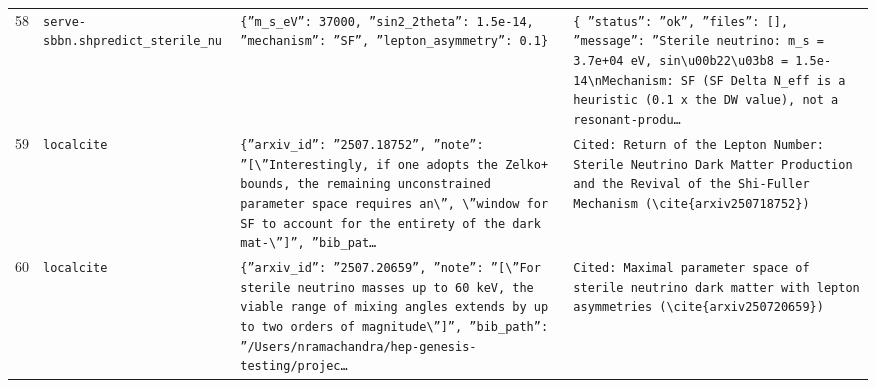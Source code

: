 \documentclass[11pt,a4paper]{article}
\begin{document}
\begin{longtable}{@{}p{}p{}p{}p{}@{}}
58 & \texttt{serve-sbbn.sh}\newline\texttt{predict\_\allowbreak{}sterile\_\allowbreak{}nu} & \texttt{\{''m\_\allowbreak{}s\_\allowbreak{}eV'':\allowbreak{} 37000,\allowbreak{} ''sin2\_\allowbreak{}2theta'':\allowbreak{} 1.5e-14,\allowbreak{} ''mechanism'':\allowbreak{} ''SF'',\allowbreak{} ''lepton\_\allowbreak{}asymmetry'':\allowbreak{} 0.1\}\allowbreak{}} & \texttt{\{   ''status'':\allowbreak{} ''ok'',\allowbreak{}   ''files'':\allowbreak{} []\allowbreak{},\allowbreak{}   ''message'':\allowbreak{} ''Sterile neutrino:\allowbreak{} m\_\allowbreak{}s =\allowbreak{} 3.7e+04 eV,\allowbreak{} sin\textbackslash{}\allowbreak{}u00b22\textbackslash{}\allowbreak{}u03b8 =\allowbreak{} 1.5e-14\textbackslash{}\allowbreak{}nMechanism:\allowbreak{} SF (SF Delta N\_\allowbreak{}eff is a heuristic (0.1 x the DW value)\allowbreak{},\allowbreak{} not a resonant-produ\ldots{}\allowbreak{}} \\
59 & \texttt{local}\newline\texttt{cite} & \texttt{\{''arxiv\_\allowbreak{}id'':\allowbreak{} ''2507.18752'',\allowbreak{} ''note'':\allowbreak{} ''[\textbackslash{}\allowbreak{}''Interestingly,\allowbreak{} if one adopts the Zelko+ bounds,\allowbreak{} the remaining unconstrained parameter space requires an\textbackslash{}\allowbreak{}'',\allowbreak{} \textbackslash{}\allowbreak{}''window for SF to account for the entirety of the dark mat-\textbackslash{}\allowbreak{}'']\allowbreak{}'',\allowbreak{} ''bib\_\allowbreak{}pat\ldots{}\allowbreak{}} & \texttt{Cited:\allowbreak{} Return of the Lepton Number:\allowbreak{} Sterile Neutrino Dark Matter Production and the Revival of the Shi-Fuller Mechanism (\textbackslash{}\allowbreak{}cite\{arxiv250718752\}\allowbreak{})\allowbreak{}} \\
60 & \texttt{local}\newline\texttt{cite} & \texttt{\{''arxiv\_\allowbreak{}id'':\allowbreak{} ''2507.20659'',\allowbreak{} ''note'':\allowbreak{} ''[\textbackslash{}\allowbreak{}''For sterile neutrino masses up to 60 keV,\allowbreak{} the viable range of mixing angles extends by up to two orders of magnitude\textbackslash{}\allowbreak{}'']\allowbreak{}'',\allowbreak{} ''bib\_\allowbreak{}path'':\allowbreak{} ''/\allowbreak{}Users/\allowbreak{}nramachandra/\allowbreak{}hep-genesis-testing/\allowbreak{}projec\ldots{}\allowbreak{}} & \texttt{Cited:\allowbreak{} Maximal parameter space of sterile neutrino dark matter with lepton asymmetries (\textbackslash{}\allowbreak{}cite\{arxiv250720659\}\allowbreak{})\allowbreak{}} \\

\end{longtable}
\end{document}
